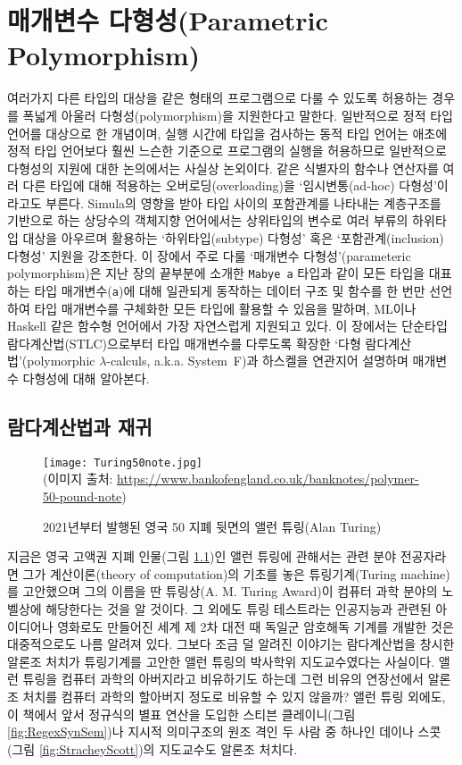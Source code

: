 \chapter{매개변수 다형성(Parametric Polymorphism)}\label{chap:ParaPoly}
여러가지 다른 타입의 대상을 같은 형태의 프로그램으로 다룰 수 있도록
허용하는 경우를 폭넓게 아울러 다형성(polymorphism)을 지원한다고 말한다.
일반적으로 정적 타입 언어를 대상으로 한 개념이며, 실행 시간에 타입을
검사하는 동적 타입 언어는 애초에 정적 타입 언어보다 훨씬 느슨한 기준으로
프로그램의 실행을 허용하므로 일반적으로 다형성의 지원에 대한 논의에서는
사실상 논외이다. 같은 식별자의 함수나 연산자를 여러 다른 타입에 대해
적용하는 오버로딩(overloading)을 `임시변통(ad-hoc) 다형성'이라고도 부른다.
Simula의 영향을 받아 타입 사이의 포함관계를 나타내는 계층구조를 기반으로
하는 상당수의 객체지향 언어에서는 상위타입의 변수로 여러 부류의
하위타입 대상을 아우르며 활용하는 `하위타입(subtype) 다형성' 혹은
`포함관계(inclusion) 다형성' 지원을 강조한다. 이 장에서 주로 다룰
`매개변수 다형성'(parameteric polymorphism)은 지난 장의 끝부분에
소개한 \texttt{Mabye a} 타입과 같이 모든 타입을 대표하는
타입 매개변수(\texttt{a})에 대해 일관되게 동작하는 데이터 구조 및 함수를
한 번만 선언하여 타입 매개변수를 구체화한 모든 타입에 활용할 수 있음을 말하며,
ML이나 Haskell 같은 함수형 언어에서 가장 자연스럽게 지원되고 있다.
이 장에서는 단순타입 람다계산법(STLC)으로부터 타입 매개변수를 다루도록
확장한 `다형 람다계산법'(polymorphic $\lambda$-calculs, a.k.a. System~F)과
하스켈을 연관지어 설명하며 매개변수 다형성에 대해 알아본다.

\section{람다계산법과 재귀}\label{sec:lambdaRec}
\begin{figure}[b]\centering
\texttt{[image: Turing50note.jpg]}\\
{\footnotesize(이미지 출처:
 \url{https://www.bankofengland.co.uk/banknotes/polymer-50-pound-note})}
\caption{2021년부터 발행된 영국 50\textsterling{} 지폐 뒷면의
	앨런 튜링(Alan Turing)\label{fig:Turing50note} }
\end{figure}
지금은 영국 고액권 지폐 인물(그림 \ref{fig:Turing50note})인 앨런 튜링에
관해서는 관련 분야 전공자라면 그가 계산이론(theory of computation)의
기초를 놓은 튜링기계(Turing machine)를 고안했으며 그의 이름을 딴
튜링상(A. M. Turing Award)이 컴퓨터 과학 분야의 노벨상에 해당한다는 것을
알 것이다. 그 외에도 튜링 테스트라는 인공지능과 관련된 아이디어나
영화로도 만들어진 세계 제 2차 대전 때 독일군 암호해독 기계를 개발한 것은
대중적으로도 나름 알려져 있다. 그보다 조금 덜 알려진 이야기는 람다계산법을
창시한 알론조 처치가 튜링기계를 고안한 앨런 튜링의 박사학위 지도교수였다는
사실이다. 앨런 튜링을 컴퓨터 과학의 아버지라고 비유하기도 하는데 그런 비유의
연장선에서 알론조 처치를 컴퓨터 과학의 할아버지 정도로 비유할 수 있지 않을까?
앨런 튜링 외에도, 이 책에서 앞서 정규식의 별표 연산을 도입한
스티븐 클레이니(그림 \ref{fig:RegexSynSem})나 지시적 의미구조의 원조 격인
두 사람 중 하나인 데이나 스콧(그림 \ref{fig:StracheyScott})의 지도교수도
알론조 처치다.

